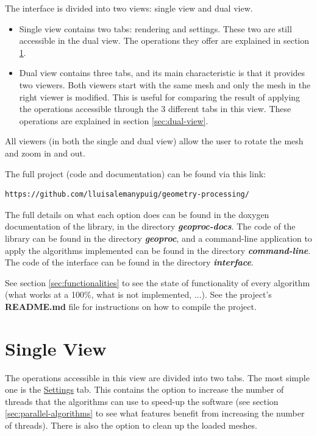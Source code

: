 \documentclass[12pt]{article}
\newcommand \dir[1] {\textbf{\textit{#1}}}
\newcommand \tabbox[1] {\underline{#1}}
\begin{document}
The interface is divided into two views: single view and dual view.
\begin{itemize}
	\item Single view contains two tabs: rendering and settings.
	These two are still accessible in the dual view. The operations
	they offer are explained in section \ref{sec:single-view}.
	
	\item Dual view contains three tabs, and its main characteristic
	is that it provides two viewers. Both viewers start with the same
	mesh and only the mesh in the right viewer is modified. This is
	useful for comparing the result of applying the operations accessible
	through the 3 different tabs in this view. These operations are
	explained in section \ref{sec:dual-view}.
\end{itemize}

All viewers (in both the single and dual view) allow the user to rotate
the mesh and zoom in and out.

\hfill

The full project (code and documentation) can be found via this link:
\begin{verbatim}
https://github.com/lluisalemanypuig/geometry-processing/
\end{verbatim}
The full details on what each option does can be found in the doxygen
documentation of the library, in the directory \dir{geoproc-docs}.
The code of the library can be found in the directory \dir{geoproc},
and a command-line application to apply the algorithms implemented can
be found in the directory \dir{command-line}. The code of the
interface can be found in the directory \dir{interface}.

\hfill

See section \ref{sec:functionalities} to see the state of functionality
of every algorithm (what works at a 100\%, what is not implemented, ...).
See the project's \textbf{README.md} file for instructions on how to
compile the project.

\section{Single View}
\label{sec:single-view}

The operations accessible in this view are divided into two tabs.
The most simple one is the \tabbox{Settings} tab. This contains the
option to increase the number of threads that the algorithms can use
to speed-up the software (see section \ref{sec:parallel-algorithms}
to see what features benefit from increasing the number of threads).
There is also the option to clean up the loaded meshes.
\end{document}
